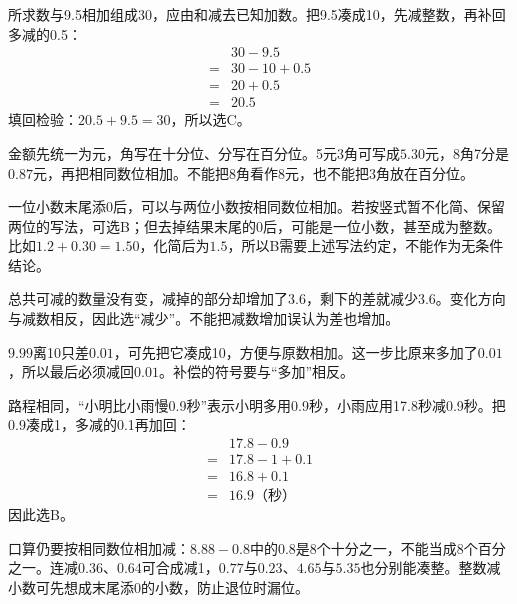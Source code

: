 \documentclass[multi=snippet,border=0pt]{standalone}
\newenvironment{snippet}[3]{\begin{minipage}{#1bp}\color{answerred}\fontsize{#2}{#3}\selectfont\raggedright}{\end{minipage}}
\begin{document}
\begin{snippet}{505}{11.5}{14}所求数与9.5相加组成30，应由和减去已知加数。把9.5凑成10，先减整数，再补回多减的0.5：\[\begin{aligned}&30-9.5\\={}&30-10+0.5\\={}&20+0.5\\={}&20.5\end{aligned}\]填回检验：\(20.5+9.5=30\)，所以选C。\end{snippet}
\begin{snippet}{505}{11.5}{14}金额先统一为元，角写在十分位、分写在百分位。5元3角可写成\(5.30\)元，8角7分是\(0.87\)元，再把相同数位相加。不能把8角看作8元，也不能把3角放在百分位。\end{snippet}
\begin{snippet}{505}{11.5}{14}一位小数末尾添0后，可以与两位小数按相同数位相加。若按竖式暂不化简、保留两位的写法，可选B；但去掉结果末尾的0后，可能是一位小数，甚至成为整数。比如\(1.2+0.30=1.50\)，化简后为\(1.5\)，所以B需要上述写法约定，不能作为无条件结论。\end{snippet}
\begin{snippet}{505}{11.5}{14}总共可减的数量没有变，减掉的部分却增加了\(3.6\)，剩下的差就减少\(3.6\)。变化方向与减数相反，因此选“减少”。不能把减数增加误认为差也增加。\end{snippet}
\begin{snippet}{505}{11.5}{14}\(9.99\)离10只差\(0.01\)，可先把它凑成10，方便与原数相加。这一步比原来多加了\(0.01\)，所以最后必须减回\(0.01\)。补偿的符号要与“多加”相反。\end{snippet}
\begin{snippet}{505}{11.5}{14}路程相同，“小明比小雨慢0.9秒”表示小明多用0.9秒，小雨应用17.8秒减0.9秒。把0.9凑成1，多减的0.1再加回：\[\begin{aligned}&17.8-0.9\\={}&17.8-1+0.1\\={}&16.8+0.1\\={}&16.9\text{（秒）}\end{aligned}\]因此选B。\end{snippet}
\begin{snippet}{505}{11.5}{14}口算仍要按相同数位相加减：\(8.88-0.8\)中的\(0.8\)是8个十分之一，不能当成8个百分之一。连减\(0.36\)、\(0.64\)可合成减1，\(0.77\)与\(0.23\)、\(4.65\)与\(5.35\)也分别能凑整。整数减小数可先想成末尾添0的小数，防止退位时漏位。\end{snippet}
\end{document}
